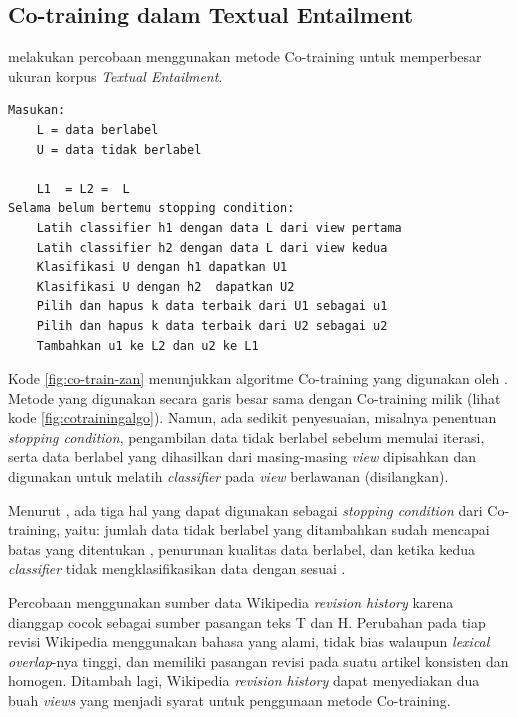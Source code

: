 	\subsection{Co-training dalam Textual Entailment}	
	\cite{zanzottoRTEexpand} melakukan percobaan menggunakan metode Co-training untuk memperbesar ukuran korpus \textit{Textual Entailment}. 
	\begin{lstlisting}[caption={Algoritme Co-training pada penelitian \cite{zanzottoRTEexpand}}, label={fig:co-train-zan}]
Masukan:
	L = data berlabel 
	U = data tidak berlabel
	
	L1  = L2 =  L
Selama belum bertemu stopping condition:
	Latih classifier h1 dengan data L dari view pertama
	Latih classifier h2 dengan data L dari view kedua
	Klasifikasi U dengan h1 dapatkan U1
	Klasifikasi U dengan h2  dapatkan U2 
	Pilih dan hapus k data terbaik dari U1 sebagai u1
	Pilih dan hapus k data terbaik dari U2 sebagai u2
	Tambahkan u1 ke L2 dan u2 ke L1

	\end{lstlisting}
	\noindent Kode \ref{fig:co-train-zan} menunjukkan algoritme Co-training yang digunakan oleh \cite{zanzottoRTEexpand}. Metode yang digunakan secara garis besar sama dengan Co-training milik \cite{blummitchell} (lihat kode \ref{fig:cotrainingalgo}). Namun, ada sedikit penyesuaian, misalnya penentuan \textit{stopping condition}, pengambilan data tidak berlabel sebelum memulai iterasi, serta data berlabel yang dihasilkan dari masing-masing \textit{view} dipisahkan dan digunakan untuk melatih \textit{classifier} pada \textit{view} berlawanan (disilangkan).
	
	Menurut \cite{zanzottoRTEexpand}, ada tiga hal yang dapat digunakan sebagai \textit{stopping condition} dari Co-training, yaitu: jumlah data tidak berlabel yang ditambahkan sudah mencapai batas yang ditentukan \citep{blummitchell}, penurunan kualitas data berlabel, dan ketika kedua \textit{classifier} tidak mengklasifikasikan data dengan sesuai \citep{Collins99unsupervisedmodels}.
	
	Percobaan \cite{zanzottoRTEexpand} menggunakan sumber data Wikipedia \textit{revision history} karena dianggap cocok sebagai sumber pasangan teks T dan H. Perubahan pada tiap revisi Wikipedia menggunakan bahasa yang alami, tidak bias walaupun \textit{lexical overlap}-nya tinggi, dan memiliki pasangan revisi pada suatu artikel konsisten dan homogen. Ditambah lagi, Wikipedia \textit{revision history} dapat menyediakan dua buah \textit{views} yang menjadi syarat untuk penggunaan metode Co-training.
	
